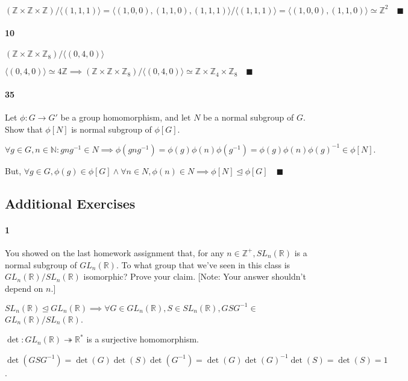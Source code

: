 \documentclass{article}
\newcommand\N{\mathbb{N}}
\newcommand\Z{\mathbb{Z}}
\newcommand\R{\mathbb{R}}
\begin{document}
$(\Z\times\Z\times \Z)/\langle (1,1,1) \rangle = \langle
(1,0,0),(1,1,0),(1,1,1) \rangle/\langle (1,1,1) \rangle = \langle
(1,0,0),(1,1,0) \rangle\simeq \Z^2 \quad \blacksquare$

\paragraph{10} $(\Z\times \Z\times \Z_8)/\langle (0,4,0) \rangle$


$\langle (0,4,0) \rangle \simeq 4\Z \implies (\Z\times \Z\times
\Z_8)/\langle (0,4,0) \rangle\simeq \Z\times \Z_4\times \Z_8 \quad
\blacksquare$

\paragraph{35} Let $\phi: G\rightarrow G'$ be a group homomorphism,
and let $N$ be a normal subgroup of $G$. Show that $\phi[N]$ is normal
subgroup of $\phi[G]$.


$\forall g\in G, n\in\N: gng^{-1} \in N \implies \phi(gng^{-1}) =
\phi(g)\phi(n)\phi(g^{-1}) = \phi(g)\phi(n)\phi(g)^{-1} \in \phi[N].$

But, $\forall g\in G, \phi(g)\in \phi[G]\land \forall n \in N,
\phi(n)\in N \implies
\phi[N]\trianglelefteq \phi[G]\quad \blacksquare$

\subsection*{Additional Exercises}

\paragraph{1} You showed on the last homework assignment that, for any $n ∈ \Z^+,SL_n(\R)$ is a normal
subgroup of $GL_n(\R)$. To what group that we’ve seen in this class is $GL_n(\R)/SL_n(\R)$
isomorphic? Prove your claim. [Note: Your answer shouldn’t depend on
$n$.]


$SL_n(\R)\trianglelefteq GL_n(\R) \implies \forall G\in
GL_n(\R), S\in SL_n(\R), GSG^{-1} \in$ $GL_n(\R)/SL_n(\R)$.

$\det: GL_n(\R)\twoheadrightarrow \R^*$ is a surjective homomorphism.

$\det(GSG^{-1}) = \det(G)\det(S)\det(G^{-1}) =
\det(G)\det(G)^{-1}\det(S) = \det(S) = 1$.
\end{document}
